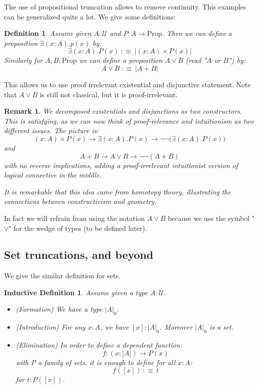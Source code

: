 \documentclass{article}
\newcommand{\sse}[1]{\medbreak \subsection{#1}}
\newcommand{\U}{{\mathcal U}}
\renewcommand{\r}{\rightarrow}
\newcommand{\Prop}{\mathrm{Prop}}
\newtheorem{definition}{Definition}
\newtheorem{remark}{Remark}
\newtheorem{ind_def}{Inductive Definition}
\begin{document}
The use of propositional truncation allows to remove continuity. This examples can be generalized quite a lot. We give some definitions:

\begin{definition}
Assume given $A:\U$ and $P:A\r \Prop$. Then we can define a proposition $\exists (x:A).p(x)$ by:
\[\exists (x:A). P(x) \ :\equiv\ |(x:A)\times P(x)|\]
Similarly for $A,B:\Prop$ we can define a proposition $A\lor B$ (read "$A$ or $B$") by:
\[A\lor B \ :\equiv\ |A+B|\]
\end{definition}

This allows us to use proof irrelevant existential and disjunctive statement. Note that $A\lor B$ is still not classical, but it is proof-irrelevant. 

\begin{remark}
We decomposed existentials and disjunctions as two constructors. This is satisfying, as we can now think of proof-relevance and intuitionism as two different issues. The picture is:
\[(x:A)\times P(x) \r \exists(x:A).P(x)\r \lnot\lnot\big(\exists(x:A).P(x)\big)\]
and 
\[A+B \r A\lor B \r \lnot\lnot(A+B)\]
with no reverse implications, adding a \emph{proof-irrelevant intuitionist} version of logical connective in the middle. 

It is remarkable that this idea came from homotopy theory, illustrating the connections between constructivism and geometry.
\end{remark}

In fact we will refrain from using the notation $A\lor B$ because we use the symbol "$\lor$" for the wedge of types (to be defined later).

\sse{Set truncations, and beyond}

We give the similar definition for sets.

\begin{ind_def}
Assume given a type $A:\U$.
\begin{itemize}
\item (Formation) We have a type $|A|_0$.
\item (Introduction) For any $x:A$, we have $[x]:|A|_0$. Moreover $|A|_0$ is a set.
\item (Elimination) In order to define a dependent function: 
\[f:(x:|A|) \r P(x)\]
with $P$ a family of sets, it is enough to define for all $x:A$:
\[f([x])\, :\equiv \, t\]
for $t:P([x])$.
\end{itemize}
\end{ind_def}
\end{document}
